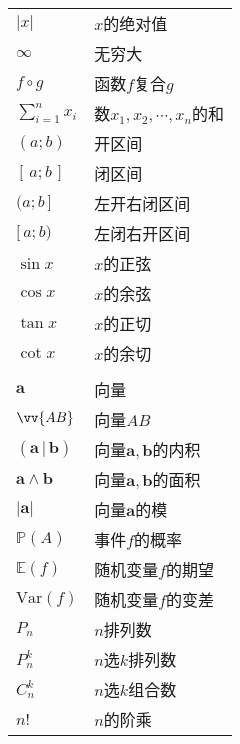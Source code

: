 \documentclass[12pt,UTF8]{article}
\begin{document}
\begin{longtable}{ m{15em} m{15em} }
    $|x|$ & $x$的绝对值 \\
    $\infty$ & 无穷大 \\
    $f\circ g$ & 函数$f$复合$g$ \\
    $\displaystyle\sum_{i=1}^n x_i$ & 数$x_1, x_2, \cdots, x_n$的和 \\
    $(a;b)$ & 开区间 \\
    $[\,a;b\,]$ & 闭区间 \\
    $(a;b\,]$ & 左开右闭区间 \\
    $[\,a;b)$ & 左闭右开区间 \\
    $\sin{x}$ & $x$的正弦 \\
    $\cos{x}$ & $x$的余弦 \\
    $\tan{x}$ & $x$的正切 \\
    $\cot{x}$ & $x$的余切 \\
    & \\
    $\mathbf{a}$ & 向量 \\
    $\vv{AB}$ & 向量$AB$\\
    $(\mathbf{a}\, | \, \mathbf{b})$ & 向量$\mathbf{a},\mathbf{b}$的内积 \\
    $\mathbf{a}\wedge \mathbf{b}$ & 向量$\mathbf{a},\mathbf{b}$的面积 \\
    $|\mathbf{a}|$ & 向量$\mathbf{a}$的模 \\
    $\mathbb{P}(A)$ & 事件$f$的概率 \\
    $\mathbb{E}(f)$ & 随机变量$f$的期望 \\
    $\mathrm{Var}(f)$ & 随机变量$f$的变差 \\
    $P_n$ & $n$排列数 \\
    $P_n^k$ & $n$选$k$排列数 \\
    $C_n^k$ & $n$选$k$组合数 \\
    $n!$ & $n$的阶乘 \\

\end{longtable}
\end{document}
